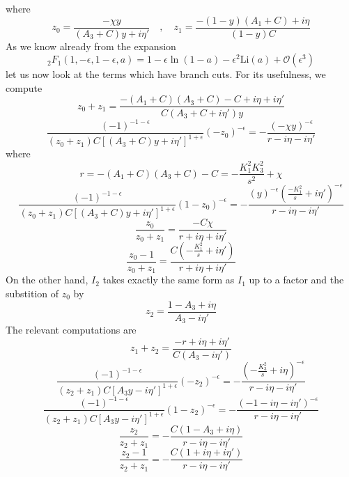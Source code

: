 where
\begin{equation*}
z_0 = \frac{-\chi y}{(A_3 + C)y +i\eta'}\quad,\quad
z_1 = \frac{-(1-y)(A_1 + C)+i\eta}{(1-y)C}
\end{equation*}
As we know already from the expansion
\begin{equation*}
{}_2F_1(1,-\epsilon,1-\epsilon,a) = 1-\epsilon\ln(1-a) - \epsilon^2\mathrm{Li}(a) + \mathcal{O}(\epsilon^{3})
\end{equation*}
let us now look at the terms which have branch cuts. 
For its usefulness, we compute
\begin{equation*}
z_0 + z_1 = \frac{-(A_1 + C)(A_3 + C) - C +i\eta + i\eta'}{C(A_3 + C + i\eta')y}
\end{equation*}
%
\begin{equation}
\frac{(-1)^{-1-\epsilon}}{(z_0+z_1)C[(A_3 + C )y + i\eta']^{1+\epsilon}}(-z_0)^{-\epsilon}
= -\frac{(-\chi y)^{-\epsilon}}{r - i\eta-i\eta'}
\end{equation}
where
\begin{equation*}
r = -(A_1 + C)(A_3 + C)-C = -\frac{K^2_1K_3^2}{s^2} +\chi 
\end{equation*}
%
\begin{equation}
\frac{(-1)^{-1-\epsilon}}{(z_0+z_1)C[(A_3 + C)y + i\eta']^{1+\epsilon}}(1-z_0)^{-\epsilon}
= - \frac{(y)^{-\epsilon}(\frac{-K_1^2}{s}+i\eta')^{-\epsilon}}{r - i\eta-i\eta'}
\end{equation}
%
\begin{equation}
\frac{z_0}{z_0 + z_1} = \frac{-C\chi }{r + i\eta + i\eta'}
\end{equation}
%
\begin{equation}
\frac{z_0 - 1}{z_0 + z_1} = \frac{C(-\frac{K_1^2}{s}+i\eta')}{r + i\eta + i\eta'}
\end{equation}
%
On the other hand, 
$I_2$ takes exactly the same form as $I_1$ up to a factor and the substition of $z_0$ by
\begin{equation*}
z_2 = \frac{1-A_3 + i\eta}{A_3-i\eta'}
\end{equation*}
The relevant computations are
\begin{equation*}
z_1 + z_2 = \frac{-r + i\eta + i\eta'}{C(A_3 - i\eta')}
\end{equation*}
%
\begin{equation}
\frac{(-1)^{-1-\epsilon}}{(z_2+z_1)C[A_3 y - i\eta']^{1+\epsilon}}(-z_2)^{-\epsilon}
= -\frac{(-\frac{K_3^2}{s} + i\eta)^{-\epsilon}}{r - i\eta-i\eta'}
\end{equation}
%
\begin{equation}
\frac{(-1)^{-1-\epsilon}}{(z_2+z_1)C[A_3y - i\eta']^{1+\epsilon}}(1-z_2)^{-\epsilon}
= - \frac{(-1-i\eta-i\eta')^{-\epsilon}}{r - i\eta-i\eta'}
\end{equation}
%
\begin{equation}
\frac{z_2}{z_2+z_1} = -\frac{C(1-A_3 + i\eta)}{r-i\eta-i\eta'}
\end{equation}
%
\begin{equation}
\frac{z_2-1}{z_2+z_1} = -\frac{C(1+i\eta+i\eta')}{r-i\eta-i\eta'}
\end{equation}
\fi


